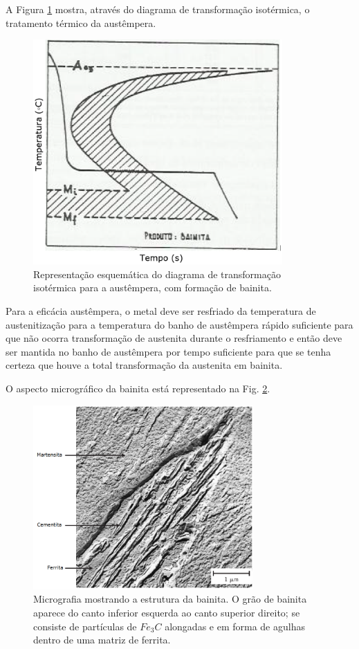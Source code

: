 \documentclass[
12pt,
openany, %
oneside, %
a4paper,			
english,			
brazil			        %
]{abntbibufjf}
\begin{document}
	A Figura \ref{fig:formacao_bainita} mostra, através do diagrama de transformação isotérmica, o tratamento térmico da austêmpera.
	
	\begin{figure}[H]
		\centering
		\includegraphics[width=0.85\textwidth]{formacao_bainita}
		\caption{Representação esquemática do diagrama de transformação isotérmica para a austêmpera, com formação de bainita. \cite{chiaverini2003tratamentos}}
		\label{fig:formacao_bainita}
	\end{figure}

	Para a eficácia austêmpera, o metal deve ser resfriado da temperatura de austenitização para a temperatura do banho de austêmpera rápido suficiente para que não ocorra transformação de austenita durante o resfriamento e então deve ser mantida no banho de austêmpera por tempo suficiente para que se tenha certeza que houve a total transformação da austenita em bainita.

	O aspecto micrográfico da bainita está representado na Fig. \ref{fig:bainita_bib}.
	
	\begin{figure}[H]
		\centering
		\includegraphics[width=0.75\textwidth]{bainita_bib}
		\caption{Micrografia mostrando a estrutura da bainita. O grão de bainita aparece do canto inferior esquerda ao canto superior direito; se consiste de partículas de $Fe_3C$ alongadas e em forma de agulhas dentro de uma matriz de ferrita. \cite{callister2011materials}}
		\label{fig:bainita_bib}
	\end{figure}
\end{document}
